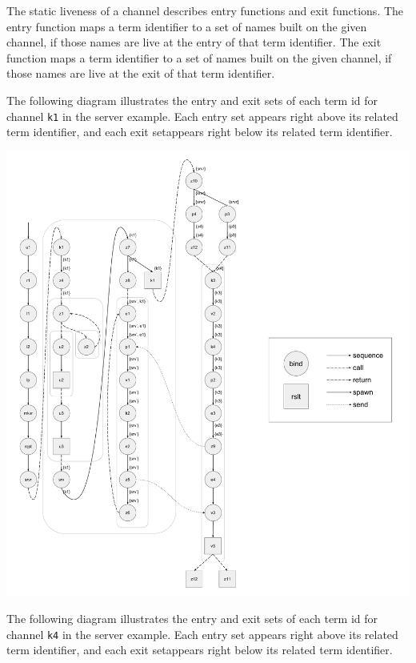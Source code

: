 \documentclass[letterpaper, 11pt]{extarticle}
\begin{document}
The static liveness of a channel describes entry functions and exit functions.
The entry function maps a term identifier to a set of names built on
the given channel, if those names are live at the entry of that term identifier.
The exit function maps a term identifier to a
set of names built on the given channel, if those names are live at the exit of that
term identifier.

The following diagram illustrates the entry and exit sets of each term id
for channel \lstinline{k1} in
the server example. Each entry set appears right above its related term identifier,
and each exit setappears right below its related term identifier. 

\includegraphics[width=1\textwidth]{cml-liveness-analysis-k1.pdf}

The following diagram illustrates the entry and exit sets of each term id
for channel \lstinline{k4} in
the server example. Each entry set appears right above its related term identifier,
and each exit setappears right below its related term identifier. 
\end{document}
